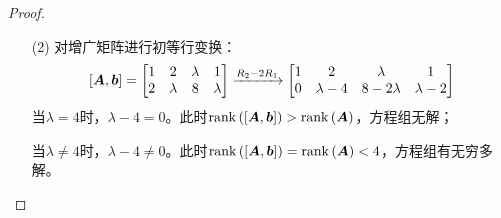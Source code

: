 \begin{proof}
    \begin{enumerate}
        \item[(2)] 对增广矩阵进行初等行变换：
              \begin{equation*}
                  \left[ \boldsymbol{A},\boldsymbol{b} \right]=
                  \begin{bmatrix}
                      1 & 2       & \lambda & 1       \\
                      2 & \lambda & 8       & \lambda
                  \end{bmatrix}\xrightarrow{R_2-2R_1}
                  \begin{bmatrix}
                      1 & 2         & \lambda    & 1         \\
                      0 & \lambda-4 & 8-2\lambda & \lambda-2
                  \end{bmatrix}
              \end{equation*}
              当\(\lambda=4\)时，\(\lambda-4=0\)。此时\(\mathrm{rank}\left( \left[ \boldsymbol{A},\boldsymbol{b} \right] \right)>\mathrm{rank}\left( \boldsymbol{A} \right)\)，方程组无解；

              当\(\lambda\neq4\)时，\(\lambda-4\neq0\)。此时\(\mathrm{rank}\left( \left[ \boldsymbol{A},\boldsymbol{b} \right] \right)=\mathrm{rank}\left( \boldsymbol{A} \right)<4\)，方程组有无穷多解。
    \end{enumerate}
\end{proof}

